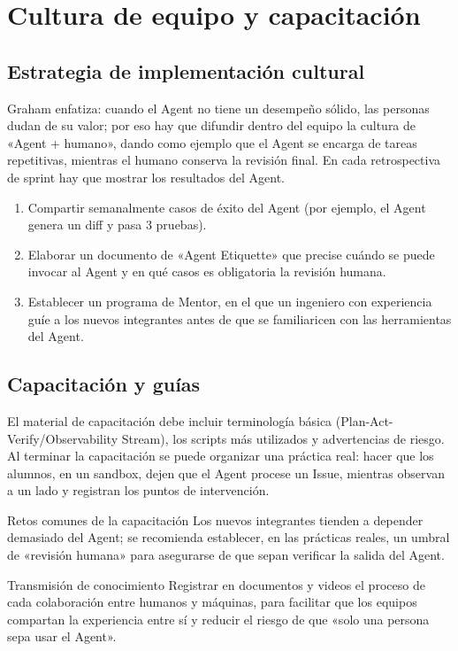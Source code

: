 \documentclass[a4paper]{article}
\begin{document}
\section{Cultura de equipo y capacitación}
\subsection{Estrategia de implementación cultural}
Graham enfatiza: cuando el Agent no tiene un desempeño sólido, las personas dudan de su valor; por eso hay que difundir dentro del equipo la cultura de «Agent + humano», dando como ejemplo que el Agent se encarga de tareas repetitivas, mientras el humano conserva la revisión final. En cada retrospectiva de sprint hay que mostrar los resultados del Agent.

\begin{enumerate}
    \item Compartir semanalmente casos de éxito del Agent (por ejemplo, el Agent genera un diff y pasa 3 pruebas).
    \item Elaborar un documento de «Agent Etiquette» que precise cuándo se puede invocar al Agent y en qué casos es obligatoria la revisión humana.
    \item Establecer un programa de Mentor, en el que un ingeniero con experiencia guíe a los nuevos integrantes antes de que se familiaricen con las herramientas del Agent.
\end{enumerate}

\subsection{Capacitación y guías}
El material de capacitación debe incluir terminología básica (Plan-Act-Verify/Observability Stream), los scripts más utilizados y advertencias de riesgo. Al terminar la capacitación se puede organizar una práctica real: hacer que los alumnos, en un sandbox, dejen que el Agent procese un Issue, mientras observan a un lado y registran los puntos de intervención.

\begin{warningbox}{Retos comunes de la capacitación}
Los nuevos integrantes tienden a depender demasiado del Agent; se recomienda establecer, en las prácticas reales, un umbral de «revisión humana» para asegurarse de que sepan verificar la salida del Agent.
\end{warningbox}

\begin{knowledgebox}{Transmisión de conocimiento}
Registrar en documentos y videos el proceso de cada colaboración entre humanos y máquinas, para facilitar que los equipos compartan la experiencia entre sí y reducir el riesgo de que «solo una persona sepa usar el Agent».
\end{knowledgebox}
\end{document}

